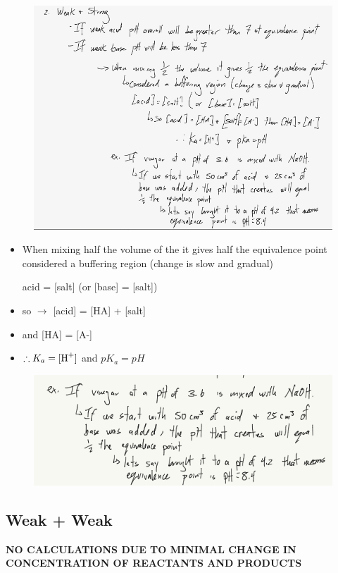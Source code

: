 \documentclass{article}
\begin{document}
\begin{enumerate}
\begin{figure}[H]
\includegraphics[width=\textwidth]{4.6figs.png}
\end{figure}

\begin{itemize}
\item When mixing half the volume of the it gives half the equivalence point\\considered a buffering region (change is slow and gradual)
\item [acid] = [salt] (or [base] = [salt])
\item so $\rightarrow$ [acid] = [HA] + [salt]
\item and [HA] = [A-]
\item $\therefore K_{a} = \ce{[H+]}$ and $pK_{a} = pH$
\end{itemize}

\begin{figure}[H]
\includegraphics[width=\textwidth]{4.6fig4.png}
\end{figure}


\end{enumerate}
\subsection{Weak + Weak}
\textbf{NO CALCULATIONS DUE TO MINIMAL CHANGE IN CONCENTRATION OF REACTANTS AND PRODUCTS}
\end{document}
